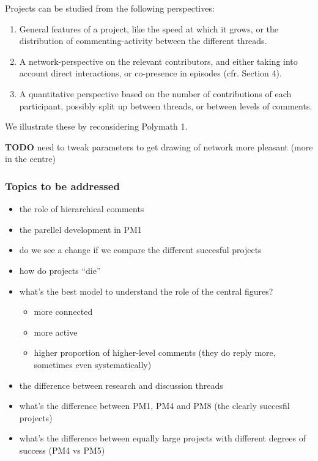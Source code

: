 \documentclass[article, floatfix, groupaddress, prb]{revtex4-1}
\providecommand{\tightlist}{%
      \setlength{\itemsep}{0pt}\setlength{\parskip}{0pt}}
\begin{document}
    Projects can be studied from the following perspectives:

\begin{enumerate}
\def\labelenumi{\arabic{enumi}.}
\tightlist
\item
  General features of a project, like the speed at which it grows, or
  the distribution of commenting-activity between the different threads.
\item
  A network-perspective on the relevant contributors, and either taking
  into account direct interactions, or co-presence in episodes (cfr.
  Section 4).
\item
  A quantitative perspective based on the number of contributions of
  each participant, possibly split up between threads, or between levels
  of comments.
\end{enumerate}

We illustrate these by reconsidering Polymath 1.




    \textbf{TODO} need to tweak parameters to get drawing of network more
pleasant (more in the centre)








    \subsubsection{Topics to be addressed}\label{topics-to-be-addressed}

\begin{itemize}
\item
  the role of hierarchical comments
\item
  the parellel development in PM1
\item
  do we see a change if we compare the different succesful projects
\item
  how do projects ``die''
\item
  what's the best model to understand the role of the central figures?

  \begin{itemize}
  \tightlist
  \item
    more connected
  \item
    more active
  \item
    higher proportion of higher-level comments (they do reply more,
    sometimes even systematically)
  \end{itemize}
\item
  the difference between research and discussion threads
\item
  what's the difference between PM1, PM4 and PM8 (the clearly succesfil
  projects)
\item
  what's the difference between equally large projects with different
  degrees of success (PM4 vs PM5)
\end{itemize}
\end{document}
